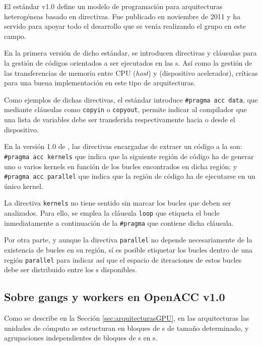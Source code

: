 El estándar \OpenACC{} v1.0 \cite{URL::OpenACC} define un modelo de programación para 
arquitecturas heterogéneas basado en directivas.
Fue publicado en noviembre de 2011 y ha servido para apoyar todo el 
desarrollo que se venía realizando el grupo \GCAP{} en este campo.

En la primera versión de dicho estándar, se introducen directivas y cláusulas para la 
gestión de códigos orientados a ser 
ejecutados en las \gpu{}s. Así como la gestión de las transferencias de memoria entre 
CPU (\textit{host}) y \gpu{} (dispositivo acelerador),
críticas para una buena implementación en este tipo de arquitecturas.

Como ejemplos de dichas directivas, el estándar introduce \texttt{\#pragma acc data}, que 
mediante cláusulas como \texttt{copyin} o \texttt{copyout}, permite indicar al 
compilador que una lista de variables debe ser transferida respectivamente hacia o desde 
el dispositivo.

En la versión 1.0 de \OpenACC{}, las directivas encargadas de extraer un código a la 
\gpu{} son: \texttt{\#pragma acc kernels} que indica que la siguiente región de código
ha de generar uno o varios kernels en función de los bucles encontrados en dicha región;
y \texttt{\#pragma acc parallel} que indica que la región de código ha de ejecutarse en un
único kernel. 

La directiva \texttt{kernels} no tiene sentido sin marcar los bucles que
deben ser analizados. Para ello, se emplea la cláusula \texttt{loop} que etiqueta el bucle
inmediatamente a continuación de la \texttt{\#pragma} que contiene dicha cláusula.

Por otra parte, y aunque la directiva \texttt{parallel} no depende necesariamente de la 
existencia de bucles en su región, sí es posible etiquetar los bucles dentro de una región 
\texttt{parallel} para indicar así que el espacio de iteraciones de estos bucles debe
ser distribuido entre los \thread{}s disponibles.


\subsection{Sobre gangs y workers en \ac{OpenACC} v1.0}
\label{subsec:gangsworkers}
Como se describe en la Sección \ref{sec:arquitecturasGPU}, en las arquitecturas \gpu{} 
las unidades de cómputo se estructuran en bloques de \thread{}s
de tamaño determinado, y agrupaciones independientes de bloques de \thread{}s en 
\grid{}s.


